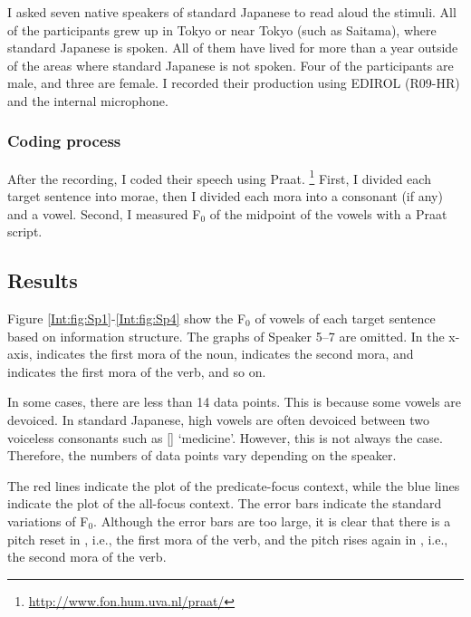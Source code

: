 I asked seven native speakers of standard Japanese
to read aloud the stimuli.
All of the participants grew up in Tokyo or near Tokyo (such as Saitama), where standard Japanese is spoken.
All of them have lived for more than a year outside of the areas where standard Japanese is not spoken.
Four of the participants are male, and three are female.
I recorded their production using EDIROL (R09-HR) and the internal microphone.

\subsubsection{Coding process}\label{Int:IUISUnitExp:Meth:Anot}

After the recording, I coded their speech using Praat.%
\footnote{\url{http://www.fon.hum.uva.nl/praat/}}
First, I divided each target sentence into morae,
then I divided each mora into a consonant (if any) and a vowel.
Second, I measured F$_{0}$ of the midpoint of the vowels with a Praat script.


\subsection{Results}

Figure \ref{Int:fig:Sp1}-\ref{Int:fig:Sp4} show
the F$_{0}$ of vowels of each target sentence based on information structure.
The graphs of Speaker 5--7 are omitted.
In the x-axis,  indicates the first mora of the noun,  indicates the second mora, and
 indicates the first mora of the verb, and so on.

In some cases, there are less than 14 data points.
This is because some vowels are devoiced.
In standard Japanese, high vowels are often devoiced between two voiceless consonants such as  [] `medicine'.
However, this is not always the case.
Therefore, the numbers of data points vary depending on the speaker.

The red lines indicate the plot of the predicate-focus context,
while the blue lines indicate the plot of the all-focus context.
The error bars indicate the standard variations of F$_{0}$.
Although the error bars are too large,
it is clear that there is a pitch reset in , i.e., the first mora of the verb,
and the pitch rises again in , i.e., the second mora of the verb.

